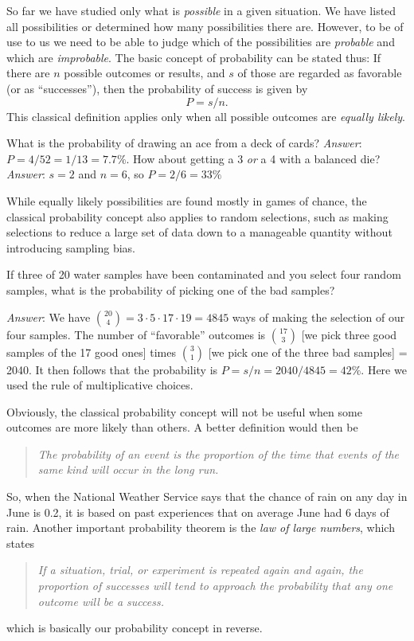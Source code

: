	So far we have studied only what is \emph{possible} in a given situation.  We have listed all 
possibilities or determined how many possibilities there are.  However, to be of use to us we 
need to be able to judge which of the possibilities are \emph{probable} and which are \emph{improbable}.
	The basic concept of probability can be stated thus: If there are $n$ possible outcomes or 
results, and $s$ of those are regarded as favorable (or as ``successes''), then the probability of
success is given by
\begin{equation}
P = s/n.
\end{equation}
This classical definition applies only when all possible outcomes are \emph{equally likely}.
\begin{example}
What is the probability of drawing an ace from a deck of cards?
\emph{Answer}:  $P = 4/52 = 1/13 = 7.7\%$.
How about getting a 3 \emph{or} a 4 with a balanced die?
\emph{Answer}: $s = 2$ and $n = 6$, so $P = 2/6 = 33\%$
\end{example}
While equally likely possibilities are found mostly in games of chance, the classical probability 
concept also applies to random selections, such as making selections to reduce a large set of data
down to a manageable quantity without introducing sampling bias.
\begin{example}
If three of 20 water samples have been 
contaminated and you select four random samples, what is the probability of picking one of the 
bad samples?

\emph{Answer}:  We have 
$\binom{20}{4} = 3 \cdot 5 \cdot 17 \cdot 19 = 4845$
ways of making the selection of our four samples.  The number of 
``favorable'' outcomes is $\binom{17}{3}$ [we pick three good samples of the 17 good ones] times $\binom{3}{1}$ 
[we pick one of  the three bad samples] = 2040.  It then follows that the probability is
$P = s/n = 2040/4845 = 42\%$.
Here we used the rule of multiplicative choices.
\end{example}

	Obviously, the classical probability concept will not be useful when some outcomes are more 
likely than others.  A better definition would then be

\begin{quote}
\emph{The probability of an event is the proportion of the time that events of the same 
kind will occur in the long run.}
\end{quote}
So, when the National Weather Service says that the chance of rain on any day in June is 0.2, it is based 
on past experiences that on average June had 6 days of rain.  Another important probability 
theorem is the \emph{law of large numbers}, which states
\begin{quote}
\emph{If a situation, trial, or experiment is repeated again and again, the proportion of 
successes will tend to approach the probability that any one outcome will be a 
success.}
\end{quote}
which is basically our probability concept in reverse.

